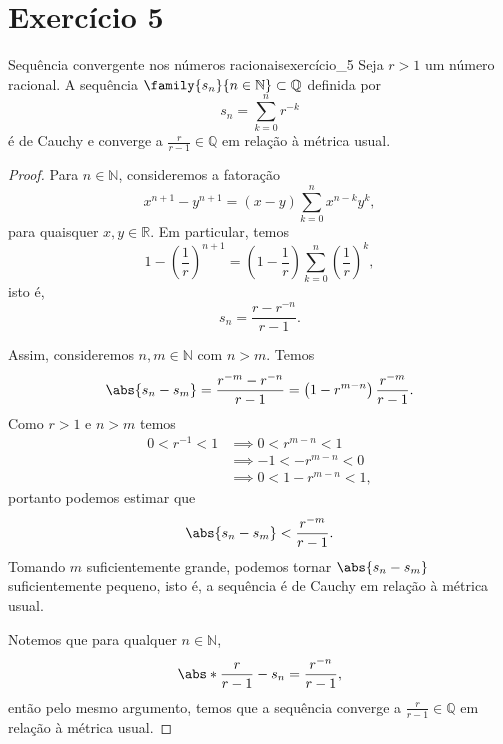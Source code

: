 \section*{Exercício 5}
\begin{proposition}{Sequência convergente nos números racionais}{exercício_5}
    Seja \(r > 1\) um número racional. A sequência \(\family{s_n}{n\in\mathbb{N}}\subset\mathbb{Q}\) definida por
    \begin{equation*}
        s_n = \sum_{k = 0}^{n} r^{-k}
    \end{equation*}
    é de Cauchy e converge a \(\frac{r}{r-1} \in \mathbb{Q}\) em relação à métrica usual.
\end{proposition}
\begin{proof}
    Para \(n \in \mathbb{N}\), consideremos a fatoração
    \begin{equation*}
        x^{n+1} - y^{n+1} = (x - y)\sum_{k = 0}^{n} x^{n - k} y^{k},
    \end{equation*}
    para quaisquer \(x,y \in \mathbb{R}\). Em particular, temos
    \begin{equation*}
        1 - \left(\frac1r\right)^{n+1} = \left(1 - \frac1r\right)\sum_{k=0}^{n} \left(\frac{1}{r}\right)^{k},
    \end{equation*}
    isto é,
    \begin{equation*}
        s_n = \frac{r - r^{-n}}{r - 1}.
    \end{equation*}

    Assim, consideremos \(n, m \in \mathbb{N}\) com \(n > m\). Temos
    \begin{equation*}
        \abs{s_n - s_m} = \frac{r^{-m} - r^{-n}}{r - 1} = \left(1 - r^{m-n}\right) \frac{r^{-m}}{r - 1}.
    \end{equation*}
    Como \(r > 1\) e \(n > m\) temos
    \begin{align*}
        0 < r^{-1} < 1 &\implies 0 < r^{m-n} < 1\\
                       &\implies -1 < -r^{m-n} < 0\\
                       &\implies 0 < 1 - r^{m-n} < 1,
    \end{align*}
    portanto podemos estimar que
    \begin{equation*}
        \abs{s_n - s_m} < \frac{r^{-m}}{r - 1}.
    \end{equation*}
    Tomando \(m\) suficientemente grande, podemos tornar \(\abs{s_n - s_m}\) suficientemente pequeno, isto é, a sequência é de Cauchy em relação à métrica usual.

    Notemos que para qualquer \(n \in \mathbb{N}\),
    \begin{equation*}
        \abs*{\frac{r}{r-1} - s_n} = \frac{r^{-n}}{r-1},
    \end{equation*}
    então pelo mesmo argumento, temos que a sequência converge a \(\frac{r}{r-1} \in \mathbb{Q}\) em relação à métrica usual.
\end{proof}
